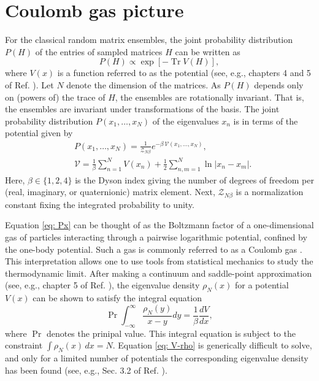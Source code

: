 \documentclass[aps, notitlepage, floatfix, pre, twocolumn]{revtex4-2}
\DeclareMathOperator{\Tr}{Tr}
\begin{document}
\section{Coulomb gas picture} \label{sec: Coulomb}
For the classical random matrix ensembles, the joint probability distribution $P(H)$ of the entries of sampled matrices $H$ can be written as
\begin{equation}
P(H) \varpropto \exp[ -\Tr V(H)],
\end{equation} 
where $V(x)$ is a function referred to as the potential (see, e.g., chapters 4 and 5 of Ref. \cite{Livan18}). Let $N$ denote the dimension of the matrices. As $P(H)$ depends only on (powers of) the trace of $H$, the ensembles are rotationally invariant. That is, the ensembles are invariant under transformations of the basis. The joint probability distribution $P(x_1, \dots, x_N)$ of the eigenvalues $x_n$ is in terms of the potential given by
\begin{align}
& P(x_1, \dots, x_N) = \frac{1}{\mathcal{Z}_{N \beta}} e^{- \beta \, \mathcal{V}(x_1, \dots, x_N)}, \label{eq: Px} \\
& \mathcal{V} = \frac{1}{\beta} \sum_{n = 1}^N V(x_n) + \frac{1}{2} \sum_{n, m = 1}^N \ln | x_n - x_m|. \label{eq: pot}
\end{align}
Here, $\beta \in \{1, 2, 4\}$ is the Dyson index giving the number of degrees of freedom per (real, imaginary, or quaternionic) matrix element. Next, $\mathcal{Z}_{N \beta}$ is a normalization constant fixing the integrated probability to unity.

Equation \eqref{eq: Px} can be thought of as the Boltzmann factor of a one-dimensional gas of particles interacting through a pairwise logarithmic potential, confined by the one-body potential. Such a gas is commonly referred to as a Coulomb gas \cite{Forrester10}. This interpretation allows one to use tools from statistical mechanics to study the thermodynamic limit. After making a continuum and saddle-point approximation (see, e.g., chapter 5 of Ref. \cite{Livan18}), the eigenvalue density $\rho_N(x)$ for a potential $V(x)$ can be shown to satisfy the integral equation
\begin{equation}
\Pr \int_{- \infty}^\infty \frac{\rho_N(y)}{x - y} dy = \frac{1}{\beta} \frac{dV}{dx},
\label{eq: V-rho}
\end{equation}
where $\Pr$ denotes the prinipal value. This integral equation is subject to the constraint $\int \rho_N(x) \, dx = N$. Equation \eqref{eq: V-rho} is generically difficult to solve, and only for a limited number of potentials the corresponding eigenvalue density has been found (see, e.g., Sec. 3.2 of Ref. \cite{Sakhnovich15}). 
\end{document}
